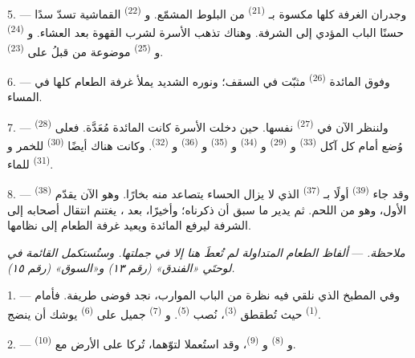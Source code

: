\VUsaut{4.6mm}
\VUsaut{3.0mm}

5. --- وجدران الغرفة كلها مكسوة بـ \textsuperscript{(21)}
من البلوط المشمّع. و \textsuperscript{(22)} القماشية تسدّ
سدًا حسنًا الباب المؤدي إلى الشرفة. وهناك تذهب الأسرة لشرب القهوة بعد
العشاء. و \textsuperscript{(24)} و
\textsuperscript{(25)} موضوعة من قبلُ على  \textsuperscript{(23)}.

6. --- وفوق المائدة  \textsuperscript{(26)} مثبّت في السقف؛
ونوره الشديد يملأ غرفة الطعام كلها في المساء.

7. --- ولننظر الآن في  \textsuperscript{(27)} نفسها. حين
دخلت الأسرة كانت المائدة مُعَدَّة. فعلى  \textsuperscript{(28)}
وُضع أمام كل آكل  \textsuperscript{(33)} و
\textsuperscript{(29)} و \textsuperscript{(34)} و
\textsuperscript{(35)} و \textsuperscript{(36)} و
\textsuperscript{(32)}. وكانت هناك أيضًا  \textsuperscript{(30)} للخمر
و \textsuperscript{(31)} للماء.

8. --- وقد جاء  \textsuperscript{(39)} أولًا بـ \textsuperscript{(37)} الذي لا يزال الحساء يتصاعد منه بخارًا. وهو الآن
يقدّم  \textsuperscript{(38)} الأول، وهو من اللحم. ثم يدير ما سبق
أن ذكرناه؛ وأخيرًا، بعد ، يغتنم انتقال أصحابه إلى الشرفة
ليرفع المائدة ويعيد غرفة الطعام إلى نظامها.

\textit{ملاحظة.} --- \textit{ألفاظ الطعام المتداولة لم تُعطَ هنا إلا في
جملتها. وستُستكمل القائمة في لوحتَي «الفندق» (رقم ١٣) و«السوق»
(رقم ١٥).}

\VUsaut{4.6mm}
\VUsaut{3.0mm}

1. --- وفي المطبخ الذي نلقي فيه نظرة من الباب الموارب، نجد فوضى
طريفة. فأمام  \textsuperscript{(1)} حيث تُطقطق 
\textsuperscript{(3)}، نُصب  \textsuperscript{(5)}. و
\textsuperscript{(7)} جميل على  \textsuperscript{(6)} يوشك أن ينضج.

2. --- و \textsuperscript{(8)} و
\textsuperscript{(9)}، وقد استُعملا لتوّهما، تُركا على الأرض مع
 \textsuperscript{(10)}.

